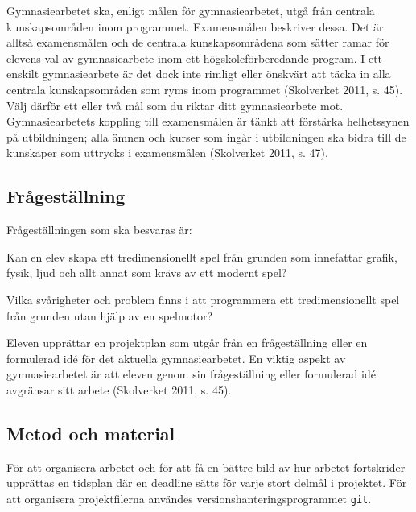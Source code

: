 \documentclass[12pt, a4paper]{article}
\newcommand{\code}{\texttt}
\begin{document}
	\begin{small}
		Gymnasiearbetet ska, enligt målen för gymnasiearbetet, utgå från centrala
kunskapsområden inom programmet. Examensmålen beskriver dessa. Det är
alltså examensmålen och de centrala kunskapsområdena som sätter ramar för
elevens val av gymnasiearbete inom ett högskoleförberedande program. I ett
enskilt gymnasiearbete är det dock inte rimligt eller önskvärt att täcka in alla
centrala kunskapsområden som ryms inom programmet (Skolverket 2011, s.
45). Välj därför ett eller två mål som du riktar ditt gymnasiearbete mot.
Gymnasiearbetets koppling till examensmålen är tänkt att förstärka
helhetssynen på utbildningen; alla ämnen och kurser som ingår i utbildningen
ska bidra till de kunskaper som uttrycks i examensmålen (Skolverket 2011, s.
47).
	\end{small}
	
	\subsection{Frågeställning}
	
	Frågeställningen som ska besvaras är: 

	\begin{center}
		Kan en elev skapa ett tredimensionellt spel från grunden som innefattar grafik, fysik, ljud och allt annat som krävs av ett modernt spel?
	\end{center}

	\begin{center}
		Vilka svårigheter och problem finns i att programmera ett tredimensionellt spel från grunden utan hjälp av en spelmotor?
	\end{center}
	
	\begin{small}
		Eleven upprättar en projektplan som utgår från en frågeställning eller en
formulerad idé för det aktuella gymnasiearbetet. En viktig aspekt av
gymnasiearbetet är att eleven genom sin frågeställning eller formulerad idé
avgränsar sitt arbete (Skolverket 2011, s. 45).
	\end{small}
	
	\subsection{Metod och material}
	
	För att organisera arbetet och för att få en bättre bild av hur arbetet fortskrider upprättas en tidsplan där en deadline sätts för varje stort delmål i projektet. För att organisera projektfilerna användes versionshanteringsprogrammet \code{git}. 
	
\end{document}
